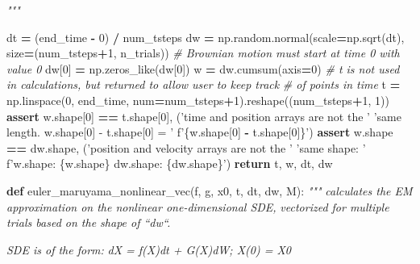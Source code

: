 \documentclass[]{article}
\newenvironment{Shaded}{\begin{snugshade}}{\end{snugshade}}
\newcommand{\CommentTok}[1]{\textcolor[rgb]{0.56,0.35,0.01}{\textit{#1}}}
\newcommand{\ControlFlowTok}[1]{\textcolor[rgb]{0.13,0.29,0.53}{\textbf{#1}}}
\newcommand{\DecValTok}[1]{\textcolor[rgb]{0.00,0.00,0.81}{#1}}
\newcommand{\KeywordTok}[1]{\textcolor[rgb]{0.13,0.29,0.53}{\textbf{#1}}}
\newcommand{\NormalTok}[1]{#1}
\newcommand{\OperatorTok}[1]{\textcolor[rgb]{0.81,0.36,0.00}{\textbf{#1}}}
\newcommand{\SpecialCharTok}[1]{\textcolor[rgb]{0.00,0.00,0.00}{#1}}
\newcommand{\SpecialStringTok}[1]{\textcolor[rgb]{0.31,0.60,0.02}{#1}}
\newcommand{\StringTok}[1]{\textcolor[rgb]{0.31,0.60,0.02}{#1}}
\begin{document}
\begin{Shaded}
\begin{Highlighting}[]
\CommentTok{    """}

\NormalTok{    dt }\OperatorTok{=}\NormalTok{ (end_time }\OperatorTok{-} \DecValTok{0}\NormalTok{) }\OperatorTok{/}\NormalTok{ num_tsteps}
\NormalTok{    dw }\OperatorTok{=}\NormalTok{ np.random.normal(scale}\OperatorTok{=}\NormalTok{np.sqrt(dt), size}\OperatorTok{=}\NormalTok{(num_tsteps}\OperatorTok{+}\DecValTok{1}\NormalTok{, n_trials))}
    \CommentTok{# Brownian motion must start at time 0 with value 0}
\NormalTok{    dw[}\DecValTok{0}\NormalTok{] }\OperatorTok{=}\NormalTok{ np.zeros_like(dw[}\DecValTok{0}\NormalTok{])}
\NormalTok{    w }\OperatorTok{=}\NormalTok{ dw.cumsum(axis}\OperatorTok{=}\DecValTok{0}\NormalTok{)}
    \CommentTok{# t is not used in calculations, but returned to allow user to keep track}
    \CommentTok{# of points in time}
\NormalTok{    t }\OperatorTok{=}\NormalTok{ np.linspace(}\DecValTok{0}\NormalTok{, end_time, num}\OperatorTok{=}\NormalTok{num_tsteps}\OperatorTok{+}\DecValTok{1}\NormalTok{).reshape((num_tsteps}\OperatorTok{+}\DecValTok{1}\NormalTok{, }\DecValTok{1}\NormalTok{))}
    \ControlFlowTok{assert}\NormalTok{ w.shape[}\DecValTok{0}\NormalTok{] }\OperatorTok{==}\NormalTok{ t.shape[}\DecValTok{0}\NormalTok{], (}\StringTok{'time and position arrays are not the '}
                                      \StringTok{'same length. w.shape[0] - t.shape[0] = '}
                                      \SpecialStringTok{f'}\SpecialCharTok{\{w.}\NormalTok{shape[}\DecValTok{0}\NormalTok{] }\OperatorTok{-} \SpecialCharTok{t.}\NormalTok{shape[}\DecValTok{0}\NormalTok{]}\SpecialCharTok{\}}\SpecialStringTok{'}\NormalTok{)}
    \ControlFlowTok{assert}\NormalTok{ w.shape }\OperatorTok{==}\NormalTok{ dw.shape, (}\StringTok{'position and velocity arrays are not the '}
                                 \StringTok{'same shape: '}
                                 \SpecialStringTok{f'w.shape: }\SpecialCharTok{\{w.}\NormalTok{shape}\SpecialCharTok{\}}\SpecialStringTok{    dw.shape: }\SpecialCharTok{\{dw.}\NormalTok{shape}\SpecialCharTok{\}}\SpecialStringTok{'}\NormalTok{)}
    \ControlFlowTok{return}\NormalTok{ t, w, dt, dw}


\KeywordTok{def}\NormalTok{ euler_maruyama_nonlinear_vec(f, g, x0, t, dt, dw, M):}
    \CommentTok{"""}
\CommentTok{    calculates the EM approximation on the nonlinear one-dimensional SDE,}
\CommentTok{    vectorized for multiple trials based on the shape of ``dw``.}

\CommentTok{    SDE is of the form:}
\CommentTok{    dX = f(X)dt + G(X)dW; X(0) = X0}


\end{Highlighting}
\end{Shaded}
\end{document}
